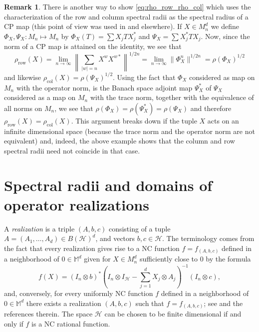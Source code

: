\documentclass[12pt]{amsart}
\numberwithin{equation}{section}
\theoremstyle{definition}
\newtheorem{remark}[theorem]{Remark}
\newcommand{\be}{\begin{equation}}
\newcommand{\ee}{\end{equation}}
\newcommand{\cH}{\mathcal{H}}
\newcommand{\bM}{\mathbb{M}}
\begin{document}
\begin{remark}
There is another way to show \eqref{eq:rho_row_rho_col} which uses the characterization of the row and column spectral radii as the spectral radius of a CP map (this point of view was used in \cite{JMS-clark,Pascoe21,SSS2} and elsewhere). 
If $X \in M_n^d$ we define $\Phi_X, \Psi_X \colon M_n \mapsto M_n$ by $\Phi_X(T) = \sum X_j T X_j^*$ and $\Psi_X = \sum X_j^* T X_j$. 
Now, since the norm of a CP map is attained on the identity, we see that 
\[
\rho_{\operatorname{row}}(X)= \lim_{n\to \infty} \left\| \sum_{|w|=n} X^w X^{w*} \right\|^{1/2n} = \lim_{n \to \infty} \|\Phi_X^n\|^{1/2n} = \rho(\Phi_X)^{1/2}
\]
and likewise $\rho_{\operatorname{col}}(X) = \rho(\Psi_X)^{1/2}$. 
Using the fact that $\Phi_X$ considered as map on $M_n$ with the operator norm, is the Banach space adjoint map $\Psi_X^*$ of $\Psi_X$ considered as a map on $M_n$ with the trace norm, together with the equivalence of all norms on $M_n$, we see that $\rho(\Phi_X) = \rho(\Psi_X^*) =\rho(\Psi_X)$ and therefore $\rho_{\operatorname{row}}(X) = \rho_{\operatorname{col}}(X)$. 
This argument breaks down if the tuple $X$ acts on an infinite dimensional space (because the trace norm and the operator norm are not equivalent) and, indeed, the above example shows that the column and row spectral radii need not coincide in that case. 
\end{remark}


\section{Spectral radii and domains of operator realizations}\label{sec:rad_pencil}

A {\em realization} is a triple $(A,b,c)$ consisting of a tuple $A = (A_1, \ldots, A_d) \in B(\cH)^d$, and vectors $b,c \in \cH$. 
The terminology comes from the fact that every realization gives rise to a NC function $f = f_{(A,b,c)}$ defined in a neighborhood of $0 \in \bM^d$ given for $X \in M_n^d$ sufficiently close to $0$ by the formula
\be\label{eq:f_realization}
f(X) = (I_n \otimes b)^* \left(I_n \otimes I_\cH - \sum_{j=1}^d X_j \otimes A_j \right)^{-1} (I_n \otimes c), 
\ee
and, conversely, for every uniformly NC function $f$ defined in a neighborhood of $0 \in \bM^d$ there exists a realization $(A,b,c)$ such that $f = f_{(A,b,c)}$; see \cite{augat2025operator} and the references therein. 
The space $\cH$ can be chosen to be finite dimensional if and only if $f$ is a NC rational function. 
\end{document}
